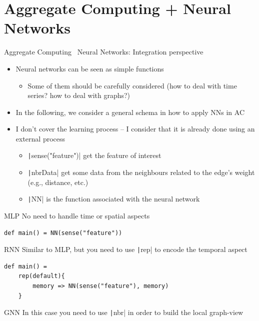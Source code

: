 \documentclass[presentation, 9pt]{beamer}\mode<presentation>{\usetheme{AMSBolognaFC}}
\begin{document}
\section{Aggregate Computing + Neural Networks}
\begin{frame}{Aggregate Computing \faPlus \, Neural Networks: Integration perspective}
\begin{itemize} 
	\item Neural networks can be seen as simple functions
	\begin{itemize}
		\item Some of them should be carefully considered (how to deal with time series? how to deal with graphs?)
	\end{itemize}
	\item In the following, we consider a general schema in how to apply NNs in AC
	\item I don't cover the learning process -- I consider that it is already done using an external process
	\begin{itemize}
		\item \texttt|sense("feature")| get the feature of interest
		\item \texttt|nbrData| get some data from the neighbours related to the edge's weight (e.g., distance, etc.)
		\item \texttt|NN| is the function associated with the neural network
	\end{itemize}
\end{itemize}
\begin{alertblock}{MLP}
No need to handle time or spatial aspects
\begin{verbatim}
def main() = NN(sense("feature"))
\end{verbatim}
\end{alertblock}
\begin{alertblock}{RNN}
Similar to MLP, but you need to use \texttt|rep| to encode the temporal aspect
\begin{verbatim}
def main() = 
	rep(default){
		memory => NN(sense("feature"), memory)
	}
\end{verbatim}
\end{alertblock}
\begin{alertblock}{GNN}
	In this case you need to use \texttt|nbr| in order to build the local graph-view
\begin{verbatim}

\end{verbatim}
\end{alertblock}
\end{frame}
\end{document}
